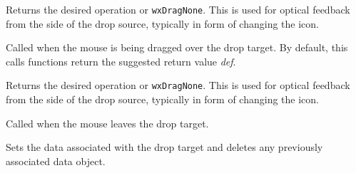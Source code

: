 




Returns the desired operation or {\tt wxDragNone}. This is used for optical feedback
from the side of the drop source, typically in form of changing the icon.

\label{wxdroptargetondragover}


Called when the mouse is being dragged over the drop target. By default, 
this calls functions return the suggested return value {\it def}.






Returns the desired operation or {\tt wxDragNone}. This is used for optical feedback
from the side of the drop source, typically in form of changing the icon.

\label{wxdroptargetonleave}


Called when the mouse leaves the drop target.

\label{wxdroptargetsetdataobject}


Sets the data  associated with the 
drop target and deletes any previously associated data object.
